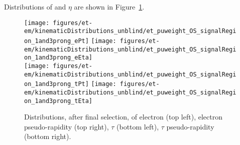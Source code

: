 Distributions of \pt and $\eta$ are shown in Figure~\ref{fig:etau_sr_pt_eta}.
\begin{figure}\centering
  \texttt{[image: figures/et-em/kinematicDistributions\_unblind/et\_puweight\_OS\_signalRegion\_1and3prong\_ePt]}
  \texttt{[image: figures/et-em/kinematicDistributions\_unblind/et\_puweight\_OS\_signalRegion\_1and3prong\_eEta]} \\
  \texttt{[image: figures/et-em/kinematicDistributions\_unblind/et\_puweight\_OS\_signalRegion\_1and3prong\_tPt]}
  \texttt{[image: figures/et-em/kinematicDistributions\_unblind/et\_puweight\_OS\_signalRegion\_1and3prong\_tEta]}
  \caption{\label{fig:etau_sr_pt_eta} Distributions, after \teth final
    selection, of electron \pt (top left), electron pseudo-rapidity
    (top right), $\tau$ \pt (bottom left), $\tau$ pseudo-rapidity
    (bottom right).}
\end{figure}

\fi

